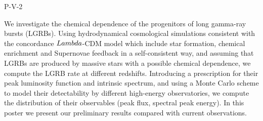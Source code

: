 P-V-2


\bigskip



\bigskip

\noindent We investigate the chemical dependence of the progenitors of long gamma-ray bursts (LGRBs). Using hydrodynamical cosmological simulations consistent with the concordance $\\Lambda$-CDM model which include star formation, chemical enrichment and Supernovae feedback in a self-consistent way, and assuming that LGRBs are produced by massive stars with a possible chemical dependence, we compute the LGRB rate at different redshifts. Introducing a prescription for their peak luminosity function and intrinsic spectrum, and using a Monte Carlo scheme to model their detectability by different high-energy observatories, we compute the distribution of their observables (peak flux, spectral peak energy). In this poster we present our preliminary results compared with current observations.

